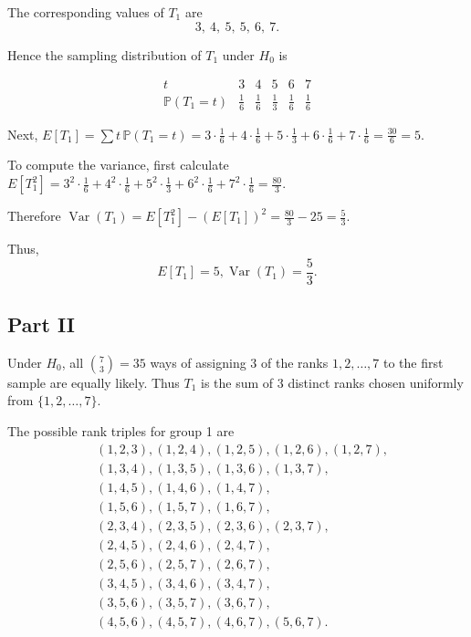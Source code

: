 \documentclass[letterpaper]{article}
\begin{document}
		The corresponding values of $T_1$ are
		\[
		3,\ 4,\ 5,\ 5,\ 6,\ 7.
		\]
		
		Hence the sampling distribution of $T_1$ under $H_0$ is
		
		\[
		\begin{array}{c|ccccc}
			t & 3 & 4 & 5 & 6 & 7\\
			\hline
			\mathbb{P}(T_1=t) & \frac16 & \frac16 & \frac13 & \frac16 & \frac16
		\end{array}
		\]
		
		Next,
		$E[T_1] = \sum t\,\mathbb{P}(T_1=t)
		= 3\cdot\frac16 + 4\cdot\frac16 + 5\cdot\frac13 + 6\cdot\frac16 + 7\cdot\frac16
		= \frac{30}{6} = 5$.
		
		To compute the variance, first calculate
		$E[T_1^2] =
		3^2\cdot\frac16 + 4^2\cdot\frac16 + 5^2\cdot\frac13 + 6^2\cdot\frac16 + 7^2\cdot\frac16
		= \frac{80}{3}$.
		
		Therefore
		$\operatorname{Var}(T_1)
		= E[T_1^2] - (E[T_1])^2
		= \frac{80}{3} - 25
		= \frac{5}{3}$.
		
		Thus,
		\[
		E[T_1] = 5,  \operatorname{Var}(T_1) = \frac{5}{3}.
		\] 
		
		\clearpage
		
		\subsection{Part II}
		
		Under $H_0$, all $\binom{7}{3}=35$ ways of assigning $3$ of the ranks
		$1,2,\dots,7$ to the first sample are equally likely. Thus $T_1$ is the sum of
		$3$ distinct ranks chosen uniformly from $\{1,2,\dots,7\}$.
		
		The possible rank triples for group 1 are
		\[
		\begin{aligned}
			&(1,2,3),(1,2,4),(1,2,5),(1,2,6),(1,2,7),\\
			&(1,3,4),(1,3,5),(1,3,6),(1,3,7),\\
			&(1,4,5),(1,4,6),(1,4,7),\\
			&(1,5,6),(1,5,7),(1,6,7),\\
			&(2,3,4),(2,3,5),(2,3,6),(2,3,7),\\
			&(2,4,5),(2,4,6),(2,4,7),\\
			&(2,5,6),(2,5,7),(2,6,7),\\
			&(3,4,5),(3,4,6),(3,4,7),\\
			&(3,5,6),(3,5,7),(3,6,7),\\
			&(4,5,6),(4,5,7),(4,6,7),(5,6,7).
		\end{aligned}
		\]
		
\end{document}
